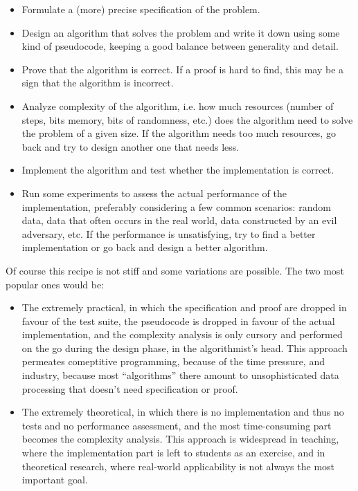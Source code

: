 \documentclass[declaration,mgr,english,shortabstract]{iithesis}
\begin{document}
\begin{itemize}
    \item Formulate a (more) precise specification of the problem.
    \item Design an algorithm that solves the problem and write it down using some kind of pseudocode, keeping a good balance between generality and detail.
    \item Prove that the algorithm is correct. If a proof is hard to find, this may be a sign that the algorithm is incorrect.
    \item Analyze complexity of the algorithm, i.e. how much resources (number of steps, bits memory, bits of randomness, etc.) does the algorithm need to solve the problem of a given size. If the algorithm needs too much resources, go back and try to design another one that needs less.
    \item Implement the algorithm and test whether the implementation is correct.
    \item Run some experiments to assess the actual performance of the implementation, preferably considering a few common scenarios: random data, data that often occurs in the real world, data constructed by an evil adversary, etc. If the performance is unsatisfying, try to find a better implementation or go back and design a better algorithm.
\end{itemize}

Of course this recipe is not stiff and some variations are possible. The two most popular ones would be:

\begin{itemize}
    \item The extremely practical, in which the specification and proof are dropped in favour of the test suite, the pseudocode is dropped in favour of the actual implementation, and the complexity analysis is only cursory and performed on the go during the design phase, in the algorithmist's head. This approach permeates comeptitive programming, because of the time pressure, and industry, because most ``algorithms'' there amount to unsophisticated data processing that doesn't need specification or proof.
    \item The extremely theoretical, in which there is no implementation and thus no tests and no performance assessment, and the most time-consuming part becomes the complexity analysis. This approach is widespread in teaching, where the implementation part is left to students as an exercise, and in theoretical research, where real-world applicability is not always the most important goal.
\end{itemize}
\end{document}
